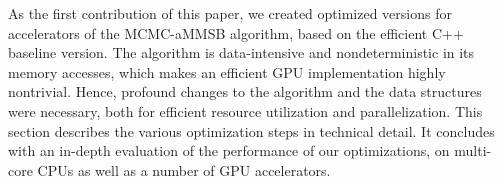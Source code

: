 
As the first contribution of this paper, we created optimized versions for
accelerators of the MCMC-aMMSB
algorithm, based on the efficient C++ baseline version.
The algorithm is data-intensive and nondeterministic in its memory accesses,
which makes an efficient GPU implementation highly nontrivial. Hence, profound
changes to the algorithm and the data structures were necessary,
both for efficient resource utilization and parallelization.
This section describes the various optimization steps in technical detail.
It concludes with an in-depth evaluation of the performance
of our optimizations,
on multi-core CPUs as well as a number of GPU accelerators.

% 


